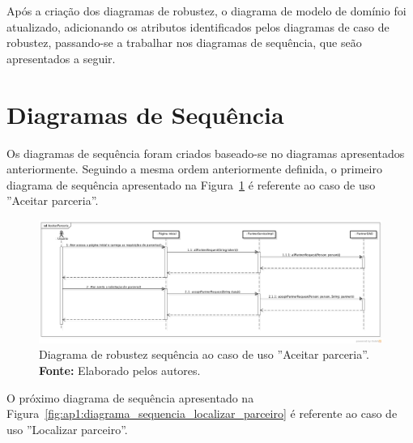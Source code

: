 Após a criação dos diagramas de robustez, o diagrama de modelo de domínio foi atualizado, adicionando os atributos identificados pelos diagramas de caso de robustez, passando-se a trabalhar nos diagramas de sequência, que seão apresentados a seguir.

\section*{Diagramas de Sequência}

Os diagramas de sequência foram criados baseado-se no diagramas apresentados anteriormente. Seguindo a mesma ordem anteriormente definida, o primeiro diagrama de sequência apresentado na Figura~\ref{fig:ap1:diagrama_sequencia_aceitar_parceria} é referente ao caso de uso ''Aceitar parceria''.

\begin{landscape}
\newpage
\captionsetup[figure]{list=no}
\begin{figure}[h!]
	\centerline{\includegraphics[scale=0.5]{./imagens/apendices/diagrama-sequencia-aceitar-parceria.png}}
	\caption[Diagrama de sequência referente ao caso de uso ''Aceitar parceria''.]
	{Diagrama de robustez sequência ao caso de uso ''Aceitar parceria''. \textbf{Fonte:} Elaborado pelos autores.}
	\label{fig:ap1:diagrama_sequencia_aceitar_parceria}
\end{figure}

O próximo diagrama de sequência apresentado na Figura~\ref{fig:ap1:diagrama_sequencia_localizar_parceiro} é referente ao caso de uso ''Localizar parceiro''.


\end{landscape}
